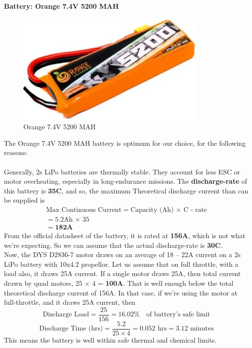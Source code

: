 \documentclass[12pt]{report}
\begin{document}
      \vspace{0.5cm}
      \noindent \textbf{Battery: Orange 7.4V 5200 MAH} \\
      \begin{figure}
        \includegraphics[width=1\linewidth]{battery.png}
        \caption{Orange 7.4V 5200 MAH}
        \label{fig:esc40a}
      \end{figure}
      The Orange 7.4V 5200 MAH battery is optimum for our choice, for the following reasons: \\ \\
Generally, 2s LiPo batteries are thermally stable. They account for less ESC or motor overheating, especially in long-endurance missions. The \textbf{discharge-rate} of this battery is \textbf{35C}, and so, the maximum Theoretical discharge current than can be supplied is 
      \begin{gather*} 
        \text{Max Continuous Current} = \text{Capacity (Ah)} \, \times \, \text{C - rate} \\
          = 5.2 \mathrm{Ah} \, \times \, 35 \\
          = \boldsymbol{182 A}
      \end{gather*}
      From the official datasheet of the battery, it is rated at \textbf{156A}, which is not what we're expecting. So we can assume that the actual discharge-rate is \textbf{30C}.  \\ 
      
      Now, the DYS D2836-7 motor draws on an average of 18 -- 22A current on a 2s LiPo battery with 10x4.2 propellor. Let us assume that on full throttle, with a load also, it draws 25A current. If a single motor draws 25A, then total current drawn by quad motors, 25 $\times$ 4 = \textbf{100A}. That is well enough below the total theoretical discharge current of 156A. In that case, if we're using the motor at full-throttle, and it draws 25A current, then \[ \text{Discharge Load} = \frac{25}{156} = 16.02 \% \quad \text{of battery's safe limit} \]  \[ \text{Discharge Time (hrs)} = \frac{5.2}{25 \times 4} = 0.052 \, \, \text{hrs} = 3.12 \, \, \text{minutes} \] This means the battery is well within safe thermal and chemical limits.
\end{document}
